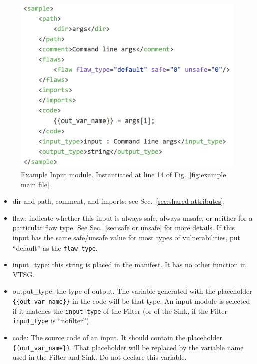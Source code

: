 \documentclass[12pt]{article}
\begin{document}
\begin{figure}[htb]
  \includegraphics{fig_Input_file.png}
  \caption{Example Input module.  Instantiated at line 14 of 
  Fig.~\ref{fig:example main file}.}
  \label{fig:example input file}
\end{figure}

\begin{itemize}
    \item dir and path, comment, and imports: see Sec.~\ref{sec:shared attributes}.

    \item flaw: indicate whether this input is always safe, always unsafe, or
      neither for a particular flaw type.  See Sec.~\ref{sec:safe or unsafe} for
      more details.  If this input has the same safe/unsafe value for most
      types of vulnerabilities, put ``default'' as the \verb|flaw_type|.

    \item input\_type: this string is placed in the manifest.  It has no other
      function in VTSG.

    \item output\_type: the type of output.  The variable generated with the
      placeholder \\ \verb|{{out_var_name}}| in the code will be that type.
      An input module is selected if it matches the \verb|input_type| of the Filter
      (or of the Sink, if the Filter \verb|input_type| is ``nofilter'').

    \item code: The source code of an input. It should contain the placeholder \\
      \verb|{{out_var_name}}|.  That placeholder will be replaced by the variable
      name used in the Filter and Sink.  Do not declare this variable.
\end{itemize}
\end{document}
